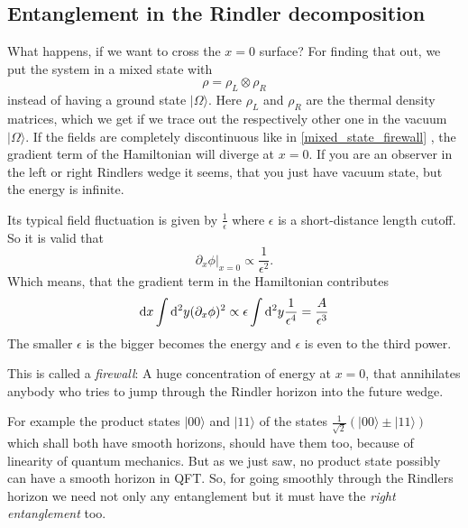 \subsection{Entanglement in the Rindler decomposition \checkmark}
	What happens, if we want to cross the $x=0$ surface? For finding that out, we put the system in a mixed state with
		\begin{equation} \label{mixed_state_firewall}
			\rho=\rho_L \otimes \rho_R
		\end{equation}
	instead of having a ground state $|\Omega\rangle$. Here $\rho_L$ and $\rho_R$ are the thermal density matrices, which we get if we trace out the respectively other one in the vacuum $|\Omega\rangle$.
	If the fields are completely discontinuous like in \eqref{mixed_state_firewall} , the gradient term of the Hamiltonian will diverge at $x=0$. If you are an observer in the left or right Rindlers wedge it seems, that you just have vacuum state, but the energy is infinite. 
	
	Its typical field fluctuation is given by $\frac{1}{\epsilon}$ where $\epsilon$ is a short-distance length cutoff.  So it is valid that
		\begin{equation}
			\partial_x \phi|_{x=0} \propto \frac{1}{\epsilon^2}.
		\end{equation}
	Which means, that the gradient term in the Hamiltonian contributes
		\begin{equation}
			\mathrm{d} x \int \mathrm{d}^2 y (\partial_x\phi)^2 \propto 
			\epsilon \int \mathrm{d}^2 y \frac{1}{\epsilon^4} 
			= \frac{A}{\epsilon^3}
		\end{equation}	
	The smaller $\epsilon$ is the bigger becomes the energy and $\epsilon$ is even to the third power.
	 			
	This is called a \textit{firewall}: A huge concentration of energy at $x=0$, that annihilates anybody who tries to jump through the Rindler horizon into the future wedge.
	
	For example the product states $|00\rangle$ and $|11\rangle$ of the states $\frac{1}{\sqrt{2}}
	(|00\rangle \pm |11\rangle)$ which shall both have smooth horizons, should have them too, because of linearity of quantum mechanics. But as we just saw, no product state possibly can have a smooth horizon in QFT. So, for going smoothly through the Rindlers horizon we need not only any entanglement but it must have the \textit{right entanglement} too.